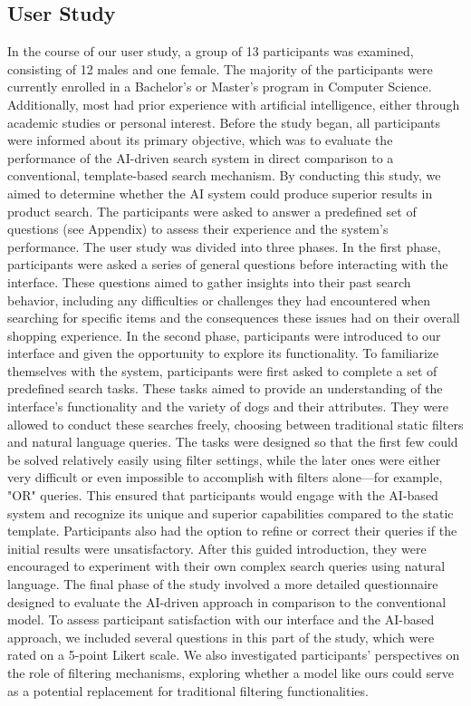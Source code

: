 \documentclass[../../submission.tex]{subfiles}
\begin{document}
\subsection{User Study}
In the course of our user study, a group of 13 participants was examined, consisting of 12 males and one female. The majority of the participants were currently enrolled in a Bachelor's or Master's program in Computer Science. Additionally, most had prior experience with artificial intelligence, either through academic studies or personal interest. 
Before the study began, all participants were informed about its primary objective, which was to evaluate the performance of the AI-driven search system in direct comparison to a conventional, template-based search mechanism. By conducting this study, we aimed to determine whether the AI system could produce superior results in product search. The participants were asked to answer a predefined set of questions (see Appendix) to assess their experience and the system's performance. 
The user study was divided into three phases. In the first phase, participants were asked a series of general questions before interacting with the interface. These questions aimed to gather insights into their past search behavior, including any difficulties or challenges they had encountered when searching for specific items and the consequences these issues had on their overall shopping experience. In the second phase, participants were introduced to our interface and given the opportunity to explore its functionality. To familiarize themselves with the system, participants were first asked to complete a set of predefined search tasks. These tasks aimed to provide an understanding of the interface’s functionality and the variety of dogs and their attributes. They were allowed to conduct these searches freely, choosing between traditional static filters and natural language queries. The tasks were designed so that the first few could be solved relatively easily using filter settings, while the later ones were either very difficult or even impossible to accomplish with filters alone—for example, "OR" queries. This ensured that participants would engage with the AI-based system and recognize its unique and superior capabilities compared to the static template. Participants also had the option to refine or correct their queries if the initial results were unsatisfactory. After this guided introduction, they were encouraged to experiment with their own complex search queries using natural language. The final phase of the study involved a more detailed questionnaire designed to evaluate the AI-driven approach in comparison to the conventional model. To assess participant satisfaction with our interface and the AI-based approach, we included several questions in this part of the study, which were rated on a 5-point Likert scale. We also investigated participants' perspectives on the role of filtering mechanisms, exploring whether a model like ours could serve as a potential replacement for traditional filtering functionalities.
\end{document}

